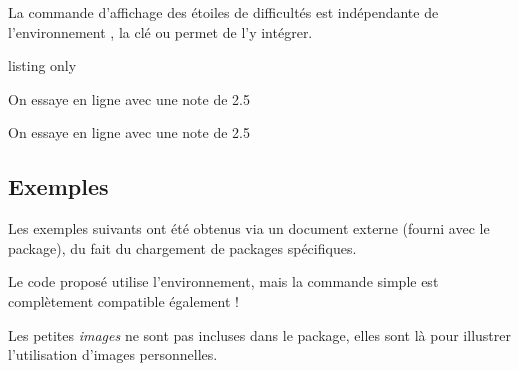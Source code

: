\documentclass[french,11pt,a4paper]{article}
\begin{document}
La commande d'affichage des étoiles de difficultés est indépendante de l'environnement , la clé  ou  permet de l'y intégrer.

\begin{DemoCode}{listing only}

\end{DemoCode}

\begin{DemoCode}{}
\par
{}\par
\textcolor{teal}{\LARGE{}}\par
{}\par
\end{DemoCode}

\begin{DemoCode}{}
\par
{\LARGE On essaye en ligne  avec une note de 2.5}\par
{\LARGE On essaye en ligne  avec une note de 2.5}\par
{}
\end{DemoCode}

\subsection{Exemples}

Les exemples suivants ont été obtenus via un document externe (fourni avec le package), du fait du chargement de packages spécifiques.

Le code proposé utilise l'environnement, mais la commande simple est complètement compatible également !

\smallskip

{\footnotesize\faExclamationTriangle} Les petites \textit{images} ne sont pas incluses dans le package, elles sont là pour illustrer l'utilisation d'images personnelles.
\end{document}
